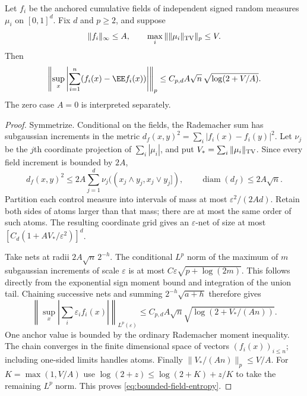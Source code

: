 \documentclass[11pt,letterpaper]{article}
\begin{document}
\begin{lemma}
\label{lem:bounded-field-entropy}
Let $f_i$ be the anchored cumulative fields of independent
signed random measures $\mu_i$ on $[0,1]^d$.
Fix $d$ and $p\ge2$, and suppose
\[
 \|f_i\|_\infty\le A,\qquad
 \max_i\|\|\mu_i\|_{\rm TV}\|_p\le V.
\]
Then
\begin{equation}\label{eq:bounded-field-entropy}
 \left\|\sup_x\left|\sum_{i=1}^n(f_i(x)-\EE f_i(x))\right|
                                                   \right\|_p
 \le C_{p,d}A\sqrt n\,\sqrt{\log(2+V/A)}.
\end{equation}
The zero case $A=0$ is interpreted separately.
\end{lemma}
\begin{proof}
Symmetrize. Conditional on the fields, the Rademacher sum
has subgaussian increments in the metric
$d_f(x,y)^2=\sum_i|f_i(x)-f_i(y)|^2$.
Let $\nu_j$ be the $j$th coordinate projection of
$\sum_i|\mu_i|$, and put $V_*=\sum_i\|\mu_i\|_{\rm TV}$.
Since every field increment is bounded by $2A$,
\[
 d_f(x,y)^2\le
   2A\sum_{j=1}^d\nu_j((x_j\wedge y_j,x_j\vee y_j]),
 \qquad \operatorname{diam}(d_f)\le2A\sqrt n.
\]
Partition each control measure into intervals of mass
at most $\varepsilon^2/(2Ad)$. Retain both sides of atoms
larger than that mass; there are at most the same order
of such atoms. The resulting coordinate grid gives an
$\varepsilon$-net of size at most
$[C_d(1+AV_*/\varepsilon^2)]^d$.

Take nets at radii $2A\sqrt n\,2^{-h}$.
The conditional $L^p$ norm of the maximum of $m$
subgaussian increments of scale $\varepsilon$ is at most
$C\varepsilon\sqrt{p+\log(2m)}$.
This follows directly from the exponential sign moment
bound and integration of the union tail.
Chaining successive nets and summing $2^{-h}\sqrt{a+h}$
therefore gives
\[
 \left\|\sup_x\left|\sum_i\varepsilon_i f_i(x)\right|
                           \right\|_{L^p(\varepsilon)}
 \le C_{p,d}A\sqrt n
               \sqrt{\log(2+V_*/(An))}.
\]
One anchor value is bounded by the ordinary Rademacher
moment inequality. The chain converges in the finite
dimensional space of vectors $(f_i(x))_{i\le n}$;
including one-sided limits handles atoms.
Finally $\|V_*/(An)\|_p\le V/A$.
For $K=\max(1,V/A)$ use
$\log(2+z)\le\log(2+K)+z/K$ to take the remaining
$L^p$ norm. This proves \eqref{eq:bounded-field-entropy}.
\end{proof}
\end{document}
